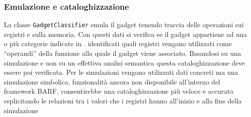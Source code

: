\subsubsection{Emulazione e cataloghizzazione}
La classe \lstinline{GadgetClassifier} emula il gadget tenendo traccia
delle operazioni sui registri e sulla memoria. Con questi dati si
verifica se il gadget appartiene ad una o più categorie indicate in
\cite{schwartz-2011}. %
identificati quali registri vengono utilizzati come ``operandi'' della
funzione alla quale il gadget viene associato. Basandosi su una
simulazione e non su un effettiva analisi semantica questa
cataloghizzazione deve essere poi verificata. Per le simulazioni
vengono utilizzati dati concreti ma una simulazione simbolica,
funzionalità ancora non disponibile all'interno del framework BARF,
consentirebbe una cataloghizzazione più veloce e accurata esplicitando
le relazioni tra i valori che i registri hanno all'inizio e alla fine
della simulazione

